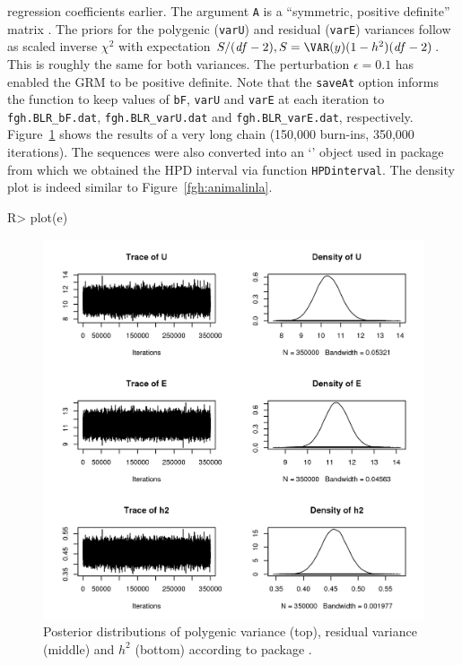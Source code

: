 \documentclass[article]{jss}
\begin{document}
regression coefficients earlier. The argument \texttt{A} is a
``symmetric, positive definite'' matrix \citep{deloscampos13}. The
priors for the polygenic (\texttt{varU}) and residual (\texttt{varE})
variances follow \cite{deloscampos13} as scaled inverse
$\chi^2$ with expectation $S/(\mathit{df}-2),
S=\VAR(y)(1-h^2)(\mathit{df}-2)$. This is roughly the same for both
variances. The perturbation
$\epsilon=0.1$ has enabled the GRM to be positive definite. Note that
the \verb/saveAt/ option informs the function to keep values of
\texttt{bF}, \texttt{varU} and \texttt{varE} at each iteration to
\texttt{fgh.BLR\_bF.dat}, \texttt{fgh.BLR\_varU.dat} and
\texttt{fgh.BLR\_varE.dat}, respectively. Figure~\ref{fgh:blr} shows the
results of a very long chain (150,000 burn-ins, 350,000 iterations).
The sequences were also converted into an `' object used
  in package  from which we obtained the HPD interval via
  function \verb/HPDinterval/.  The density plot is indeed similar to
  Figure~\ref{fgh:animalinla}.
%
\begin{CodeChunk}
\begin{CodeInput}
R> plot(e)
\end{CodeInput}
\end{CodeChunk}
%
\begin{figure}[t!]
\centering
\includegraphics[width=\textwidth, trim = 0 10 0 10, clip]{fgh_BLR.png}
\caption{Posterior distributions of polygenic variance (top), 
residual variance (middle) and $h^2$ (bottom) according to package .}
\label{fgh:blr}
\end{figure}
\end{document}
